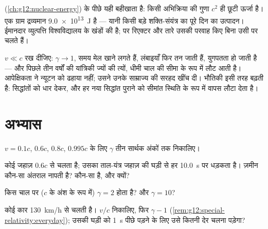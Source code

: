 \begin{remark}[आप इससे कहाँ मिल चुके हैं]\label{rem:g12:special-relativity:emc2seen}
 (\cref{ch:g12:nuclear-energy}) के पीछे यही बहीखाता है: किसी अभिक्रिया की
 गुणा $c^2$ ही छूटी ऊर्जा है। एक ग्राम
द्रव्यमान \qty{9.0e13}{J} है --- यानी किसी बड़े शक्ति-संयंत्र का पूरे दिन का
उत्पादन। ईमानदार व्युत्पत्ति विश्वविद्यालय के खंडों की है; पर रिएक्टर और तारे
उसकी परवाह किए बिना उसी पर चलते हैं।
\end{remark}

\begin{remark}[न्यूटन ग़लत नहीं थे]\label{rem:g12:special-relativity:newton}
$v \ll c$ रख दीजिए: $\gamma \to 1$, समय मेल खाने लगते हैं, लंबाइयाँ फिर तन जाती हैं,
युगपतता  हो जाती है --- और पिछले तीन वर्षों की यांत्रिकी ज्यों की त्यों,
धीमी चाल की सीमा के रूप में लौट आती है। आपेक्षिकता ने न्यूटन को ढहाया नहीं;
उसने उनके साम्राज्य की सरहद खींच दी। भौतिकी इसी तरह बढ़ती है: सिद्धांतों को
धार देकर, और हर नया सिद्धांत पुराने को सीमांत स्थिति के रूप में वापस लौटा देता
है।
\end{remark}

\section{अभ्यास}

\begin{exercise}[$\star$]\label{exo:g12:special-relativity:1}
$v = 0.1c$, $0.6c$, $0.8c$, $0.995c$ के लिए $\gamma$ तीन सार्थक अंकों तक
निकालिए।
\end{exercise}

\begin{exercise}[$\star$]\label{exo:g12:special-relativity:2}
कोई जहाज़ $0.6c$ से चलता है; उसका ताल-यंत्र जहाज़ की घड़ी से हर \qty{10.0}{s} पर
धड़कता है। ज़मीन कौन-सा अंतराल नापती है?  कौन-सा है, और क्यों?
\end{exercise}

\begin{exercise}[$\star$]\label{exo:g12:special-relativity:3}
किस चाल पर ($c$ के अंश के रूप में) $\gamma = 2$ होता है? और $\gamma = 10$?
\end{exercise}

\begin{exercise}[$\star$]\label{exo:g12:special-relativity:4}
कोई कार \qty{130}{km/h} से चलती है। $v/c$ निकालिए, फिर $\gamma - 1$ (\cref{rem:g12:special-relativity:everyday}); उसकी घड़ी
को \qty{1}{s} पीछे पड़ने के लिए उसे कितनी देर चलना पड़ेगा?
\end{exercise}

